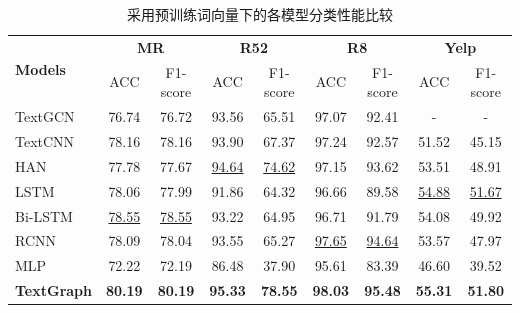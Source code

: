 \begin{table}[htb]
    \centering
    \caption{ 采用预训练词向量下的各模型分类性能比较}
    \renewcommand\arraystretch{1}
    \renewcommand\tabcolsep{2mm}
    \label{tab:acc-result}
    \begin{tabular}{lcccccccc}
    \hline
    \multirow{2}{*}{\textbf{Models}} & \multicolumn{2}{c}{\textbf{MR}} & \multicolumn{2}{c}{\textbf{R52}} & \multicolumn{2}{c}{\textbf{R8}} & \multicolumn{2}{c}{\textbf{Yelp}}  \\
    \cline{2-9}
                            & ACC   & F1-score       & ACC   & F1-score        & ACC   & F1-score       & ACC   & F1-score          \\
    \hline
    TextGCN                 & 76.74 & 76.72         & 93.56 & 65.51          & 97.07 & 92.41         & -     & -                 \\
    TextCNN                 & 78.16 & 78.16         & 93.90  & 67.37          & 97.24 & 92.57         & 51.52 & 45.15            \\
    HAN                     & 77.78 & 77.67         & \underline{94.64} & \underline{74.62}          & 97.15 & 93.62         & 53.51 & 48.91            \\
    LSTM                    & 78.06 & 77.99         & 91.86 & 64.32          & 96.66 & 89.58         & \underline{54.88} & \underline{51.67}            \\
    Bi-LSTM                 & \underline{78.55} & \underline{78.55}         & 93.22 & 64.95          & 96.71 & 91.79         & 54.08 & 49.92            \\
    RCNN                   & 78.09 & 78.04         & 93.55 & 65.27          & \underline{97.65} & \underline{94.64}          & 53.57 & 47.97            \\
    MLP                     & 72.22 & 72.19         & 86.48 & 37.90           & 95.61 & 83.39         & 46.60  & 39.52            \\
    \hline
    \textbf{TextGraph}                   & \textbf{80.19} & \textbf{80.19}         & \textbf{95.33} & \textbf{78.55}          & \textbf{98.03} & \textbf{95.48}         & \textbf{55.31} & \textbf{51.80}            \\
    \hline
    \end{tabular}
    \end{table}

